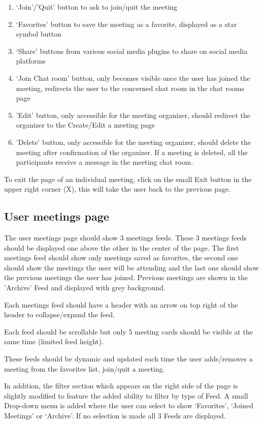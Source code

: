 \documentclass[conference]{IEEEtran}
\begin{document}
\begin{enumerate}
    \item ‘Join’/'Quit' button to ask to join/quit the meeting
    \item ‘Favorites’ button to save the meeting as a favorite, displayed as a star symbol button
    \item ‘Share’ buttons from various social media plugins to share on social media platforms
    \item ‘Join Chat room’ button, only becomes visible once the user has joined the meeting, redirects the user to the concerned chat room in the chat rooms page
    \item 'Edit' button, only accessible for the meeting organizer, should redirect the organizer to the Create/Edit a meeting page
    \item 'Delete' button, only accessible for the meeting organizer, should delete the meeting after confirmation of the organizer. 
    If a meeting is deleted, all the participants receive a message in the meeting chat room.
\end{enumerate}

To exit the page of an individual meeting, click on the small Exit button in the upper right corner (X), this will take the user back to the previous page.

\subsection{User meetings page}

The user meetings page should show 3 meetings feeds.
These 3 meetings feeds should be displayed one above the other in the center of the page.
The first meetings feed should show only meetings saved as favorites, the second one should show the meetings the user will be attending and the last one should show the previous meetings the user has joined.
Previous meetings are shown in the 'Archive' Feed and displayed with grey background.

Each meetings feed should have a header with an arrow on top right of the header to collapse/expand the feed.

Each feed should be scrollable but only 5 meeting cards should be visible at the same time (limited feed height).

These feeds should be dynamic and updated each time the user adds/removes a meeting from the favorites list, join/quit a meeting.

In addition, the filter section which appears on the right side of the page is slightly modified to feature the added ability to filter by type of Feed. A small Drop-down menu is added where the user can select to show ‘Favorites’, ‘Joined Meetings’ or ‘Archive’. If no selection is made all 3 Feeds are displayed.
\end{document}
